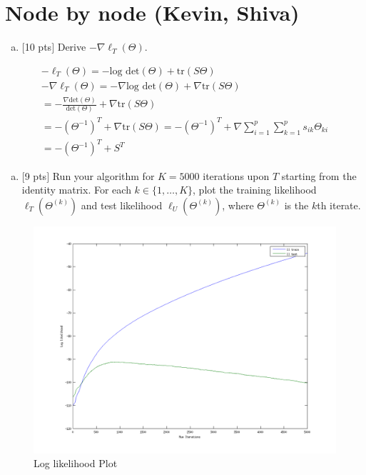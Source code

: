 \documentclass[12pt]{article}
\begin{document}
\newpage
\clearpage


\section{Node by node (Kevin, Shiva)}


\begin{enumerate}[(a)]
\item $[$10 pts$]$ Derive $-\nabla\ell_T(\Theta)$.
\end{enumerate}

\begin{align*}
-\ell_T(\Theta) = -\textrm{log det}(\Theta) + \textrm{tr}(S\Theta) \\
-\nabla\ell_T(\Theta) = -\nabla \textrm{log det}(\Theta) + \nabla \textrm{tr}(S\Theta) \\
 = -\frac{\nabla \textrm{det}(\Theta)}{\textrm{det}(\Theta)} + \nabla \textrm{tr}(S\Theta)  \\
 = -(\Theta^{-1})^{T} + \nabla \textrm{tr}(S\Theta) 
 = -(\Theta^{-1})^{T} + \nabla \sum_{i=1}^{p} \sum_{k=1}^{p} {s_{ik}\Theta_{ki}} \\
 = -(\Theta^{-1})^{T} + S^T
\end{align*}

\vspace{.25cm}

\begin{enumerate}[(d)]
\item $[$9 pts$]$  Run your algorithm for $K = 5000$ iterations upon $T$ starting from the identity matrix. For each $k \in \{1,\ldots,K\}$, plot the training likelihood $\ell_T(\Theta^{(k)})$ and test likelihood $\ell_U(\Theta^{(k)})$, where $\Theta^{(k)}$ is the $k$th iterate.
\end{enumerate}

\begin{figure}[h!]
  \centering
    \includegraphics[width=\textwidth]{ll}
  \caption{Log likelihood Plot}
\end{figure}
\end{document}

